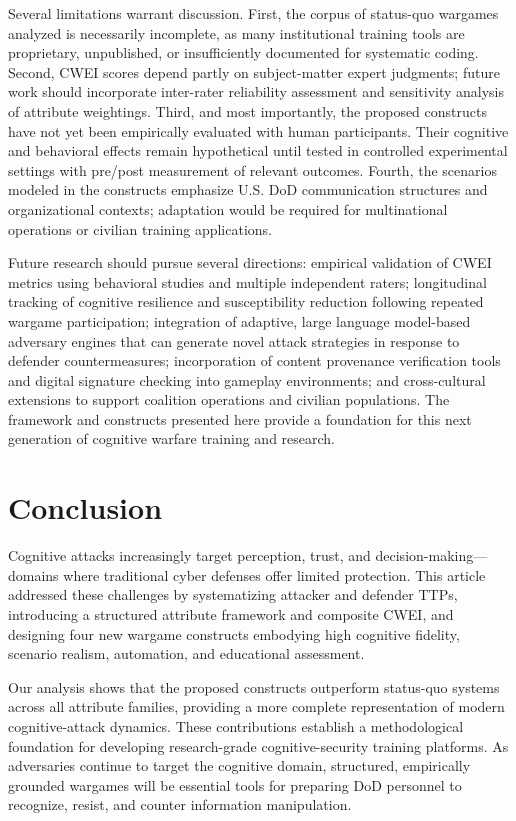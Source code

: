 \documentclass[12pt]{article}
\begin{document}
Several limitations warrant discussion. First, the corpus of status-quo wargames analyzed is necessarily incomplete, as many institutional training tools are proprietary, unpublished, or insufficiently documented for systematic coding. Second, CWEI scores depend partly on subject-matter expert judgments; future work should incorporate inter-rater reliability assessment and sensitivity analysis of attribute weightings. Third, and most importantly, the proposed constructs have not yet been empirically evaluated with human participants. Their cognitive and behavioral effects remain hypothetical until tested in controlled experimental settings with pre/post measurement of relevant outcomes. Fourth, the scenarios modeled in the constructs emphasize U.S. DoD communication structures and organizational contexts; adaptation would be required for multinational operations or civilian training applications.

Future research should pursue several directions: empirical validation of CWEI metrics using behavioral studies and multiple independent raters; longitudinal tracking of cognitive resilience and susceptibility reduction following repeated wargame participation; integration of adaptive, large language model-based adversary engines that can generate novel attack strategies in response to defender countermeasures; incorporation of content provenance verification tools and digital signature checking into gameplay environments; and cross-cultural extensions to support coalition operations and civilian populations. The framework and constructs presented here provide a foundation for this next generation of cognitive warfare training and research.

\section{Conclusion}

Cognitive attacks increasingly target perception, trust, and decision-making---domains where traditional cyber defenses offer limited protection. This article addressed these challenges by systematizing attacker and defender TTPs, introducing a structured attribute framework and composite CWEI, and designing four new wargame constructs embodying high cognitive fidelity, scenario realism, automation, and educational assessment.

Our analysis shows that the proposed constructs outperform status-quo systems across all attribute families, providing a more complete representation of modern cognitive-attack dynamics. These contributions establish a methodological foundation for developing research-grade cognitive-security training platforms. As adversaries continue to target the cognitive domain, structured, empirically grounded wargames will be essential tools for preparing DoD personnel to recognize, resist, and counter information manipulation.

\theendnotes
\end{document}
